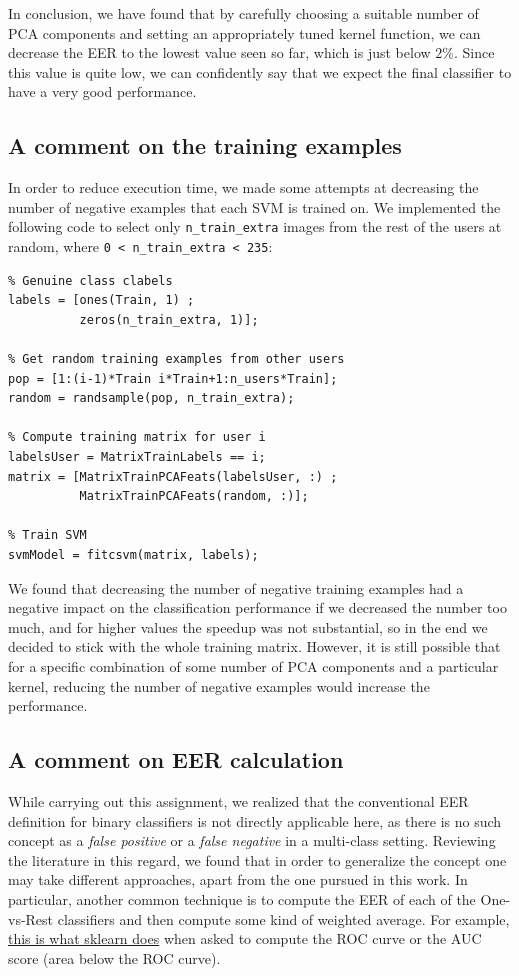 \documentclass[11pt]{article}
\begin{document}
In conclusion, we have found that by carefully choosing a suitable number of PCA components and setting an appropriately tuned kernel function, we can decrease the EER to the lowest value seen so far, which is just below $2\%$. Since this value is quite low, we can confidently say that we expect the final classifier to have a very good performance.

\subsection*{A comment on the training examples}

In order to reduce execution time, we made some attempts at decreasing the number of negative examples that each SVM is trained on. We implemented the following code to select only \verb|n_train_extra| images from the rest of the users at random, where \verb|0 < n_train_extra < 235|:
\begin{verbatim}
% Genuine class clabels
labels = [ones(Train, 1) ;
          zeros(n_train_extra, 1)];

% Get random training examples from other users
pop = [1:(i-1)*Train i*Train+1:n_users*Train];
random = randsample(pop, n_train_extra);

% Compute training matrix for user i
labelsUser = MatrixTrainLabels == i;
matrix = [MatrixTrainPCAFeats(labelsUser, :) ;
          MatrixTrainPCAFeats(random, :)];

% Train SVM
svmModel = fitcsvm(matrix, labels);
\end{verbatim}

We found that decreasing the number of negative training examples had a negative impact on the classification performance if we decreased the number too much, and for higher values the speedup was not substantial, so in the end we decided to stick with the whole training matrix. However, it is still possible that for a specific combination of some number of PCA components and a particular kernel, reducing the number of negative examples would increase the performance.

\subsection*{A comment on EER calculation}

While carrying out this assignment, we realized that the conventional EER definition for binary classifiers is not directly applicable here, as there is no such concept as a \textit{false positive} or a \textit{false negative} in a multi-class setting. Reviewing the literature in this regard, we found that in order to generalize the concept one may take different approaches, apart from the one pursued in this work. In particular, another common technique is to compute the EER of each of the One-vs-Rest classifiers and then compute some kind of weighted average. For example, \href{https://scikit-learn.org/stable/auto_examples/model_selection/plot_roc.html}{this is what sklearn does} when asked to compute the ROC curve or the AUC score (area below the ROC curve).
\end{document}

